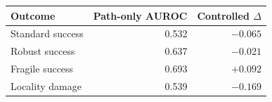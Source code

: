 \begin{center}
\centering
\small
{}
\label{tab:editing-transfer}
\begin{tabular}{lrr}
\toprule
Outcome & Path-only AUROC & Controlled $\Delta$ \\
\midrule
Standard success & 0.532 & $-0.065$ \\
Robust success & 0.637 & $-0.021$ \\
Fragile success & 0.693 & $+0.092$ \\
Locality damage & 0.539 & $-0.169$ \\
\bottomrule
\end{tabular}
\end{center}
